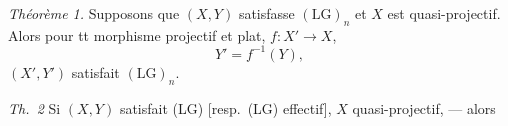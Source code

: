 \documentclass[11pt,a4paper]{article}
\begin{document}
\emph{Théorème 1.} Supposons que  $(X, Y)$ satisfasse $(\mathrm{LG})_n$ et $X$ est quasi-projectif. Alors pour tt   morphisme projectif et plat, \struck{\ill{}} $f\colon X' \to X$, 
\[
  Y' = f^{-1}(Y) ,
\]
$(X', Y')$ satisfait $(\mathrm{LG})_n$.


\emph{Th.~2} Si $(X, Y)$ satisfait (LG) [resp.\ (LG) effectif], $X$ quasi-projectif, --- alors
\end{document}
